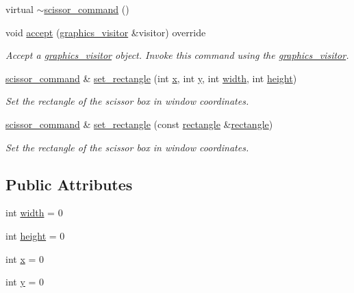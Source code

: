 \begin{DoxyCompactItemize}
\item 
virtual \mbox{\hyperlink{classmoka_1_1scissor__command_aebc1d84e16d381d8ff49c5c360dbcb47}{$\sim$scissor\+\_\+command}} ()
\item 
void \mbox{\hyperlink{classmoka_1_1scissor__command_aae68551e35f929ea61bae3640af68ed8}{accept}} (\mbox{\hyperlink{classmoka_1_1graphics__visitor}{graphics\+\_\+visitor}} \&visitor) override
\begin{DoxyCompactList}\small\item\em Accept a \mbox{\hyperlink{classmoka_1_1graphics__visitor}{graphics\+\_\+visitor}} object. Invoke this command using the \mbox{\hyperlink{classmoka_1_1graphics__visitor}{graphics\+\_\+visitor}}. \end{DoxyCompactList}\item 
\mbox{\hyperlink{classmoka_1_1scissor__command}{scissor\+\_\+command}} \& \mbox{\hyperlink{classmoka_1_1scissor__command_a984da08fc55c8643f0e12514460ec386}{set\+\_\+rectangle}} (int \mbox{\hyperlink{classmoka_1_1scissor__command_a81d94c0a6c2c3cfd0e1719d44c9eeb0b}{x}}, int \mbox{\hyperlink{classmoka_1_1scissor__command_a550da319eb32d86afbd60a72c0f30532}{y}}, int \mbox{\hyperlink{classmoka_1_1scissor__command_aac88f787b8e446f923722dda70837a39}{width}}, int \mbox{\hyperlink{classmoka_1_1scissor__command_aa1ab1cbe7525e54cfd66ac8478854549}{height}})
\begin{DoxyCompactList}\small\item\em Set the rectangle of the scissor box in window coordinates. \end{DoxyCompactList}\item 
\mbox{\hyperlink{classmoka_1_1scissor__command}{scissor\+\_\+command}} \& \mbox{\hyperlink{classmoka_1_1scissor__command_a9ada0c78216aa05327fe158ff63cf333}{set\+\_\+rectangle}} (const \mbox{\hyperlink{namespacemoka_ab5e90635f0a0441cc99f2328bc34500d}{rectangle}} \&\mbox{\hyperlink{namespacemoka_ab5e90635f0a0441cc99f2328bc34500d}{rectangle}})
\begin{DoxyCompactList}\small\item\em Set the rectangle of the scissor box in window coordinates. \end{DoxyCompactList}\end{DoxyCompactItemize}
\subsection*{Public Attributes}
\begin{DoxyCompactItemize}
\item 
int \mbox{\hyperlink{classmoka_1_1scissor__command_aac88f787b8e446f923722dda70837a39}{width}} = 0
\item 
int \mbox{\hyperlink{classmoka_1_1scissor__command_aa1ab1cbe7525e54cfd66ac8478854549}{height}} = 0
\item 
int \mbox{\hyperlink{classmoka_1_1scissor__command_a81d94c0a6c2c3cfd0e1719d44c9eeb0b}{x}} = 0
\item 
int \mbox{\hyperlink{classmoka_1_1scissor__command_a550da319eb32d86afbd60a72c0f30532}{y}} = 0
\end{DoxyCompactItemize}


